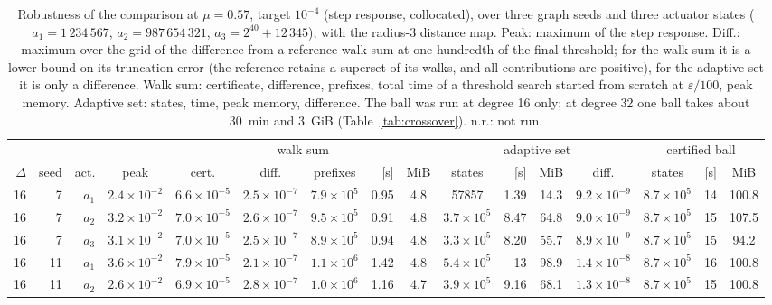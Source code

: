 \documentclass[aps,pra,superscriptaddress,floatfix,longbibliography,twocolumn]{revtex4-2}
\begin{document}
\begin{table}[t]
\footnotesize\setlength{\tabcolsep}{2.4pt}
\caption{Robustness of the comparison at $\mu=0.57$, target $10^{-4}$ (step response, collocated), over three graph seeds and three actuator states ($a_1=1\,234\,567$, $a_2=987\,654\,321$, $a_3=2^{40}+12\,345$), with the radius-3 distance map. Peak: maximum of the step response. Diff.: maximum over the grid of the difference from a reference walk sum at one hundredth of the final threshold; for the walk sum it is a lower bound on its truncation error (the reference retains a superset of its walks, and all contributions are positive), for the adaptive set it is only a difference. Walk sum: certificate, difference, prefixes, total time of a threshold search started from scratch at $\varepsilon/100$, peak memory. Adaptive set: states, time, peak memory, difference. The ball was run at degree 16 only; at degree 32 one ball takes about 30~min and 3~GiB (Table~\ref{tab:crossover}). n.r.: not run.}\label{tab:ensemble}
\begin{ruledtabular}
\begin{tabular}{rrrc|cccrc|crcc|crc}
 & & & & \multicolumn{5}{c|}{walk sum} & \multicolumn{4}{c|}{adaptive set} & \multicolumn{3}{c}{certified ball}\\
$\Delta$ & seed & act. & peak & cert. & diff. & prefixes & [s] & MiB & states & [s] & MiB & diff. & states & [s] & MiB\\\hline
16 & 7 & $a_1$ & $2.4\times10^{-2}$ & $6.6\times10^{-5}$ & $2.5\times10^{-7}$ & $7.9\times10^{5}$ & 0.95 & 4.8 & 57857 & 1.39 & 14.3 & $9.2\times10^{-9}$ & $8.7\times10^{5}$ & 14 & 100.8 \\
16 & 7 & $a_2$ & $3.2\times10^{-2}$ & $7.0\times10^{-5}$ & $2.6\times10^{-7}$ & $9.5\times10^{5}$ & 0.91 & 4.8 & $3.7\times10^{5}$ & 8.47 & 64.8 & $9.0\times10^{-9}$ & $8.7\times10^{5}$ & 15 & 107.5 \\
16 & 7 & $a_3$ & $3.1\times10^{-2}$ & $7.0\times10^{-5}$ & $2.5\times10^{-7}$ & $8.9\times10^{5}$ & 0.94 & 4.8 & $3.3\times10^{5}$ & 8.20 & 55.7 & $8.9\times10^{-9}$ & $8.7\times10^{5}$ & 15 & 94.2 \\
16 & 11 & $a_1$ & $3.6\times10^{-2}$ & $7.9\times10^{-5}$ & $2.1\times10^{-7}$ & $1.1\times10^{6}$ & 1.42 & 4.8 & $5.4\times10^{5}$ & 13 & 98.9 & $1.4\times10^{-8}$ & $8.7\times10^{5}$ & 16 & 100.8 \\
16 & 11 & $a_2$ & $2.6\times10^{-2}$ & $6.9\times10^{-5}$ & $2.8\times10^{-7}$ & $1.0\times10^{6}$ & 1.16 & 4.7 & $3.9\times10^{5}$ & 9.16 & 68.1 & $1.3\times10^{-8}$ & $8.7\times10^{5}$ & 15 & 100.8 \\

\end{tabular}
\end{ruledtabular}
\end{table}
\end{document}
